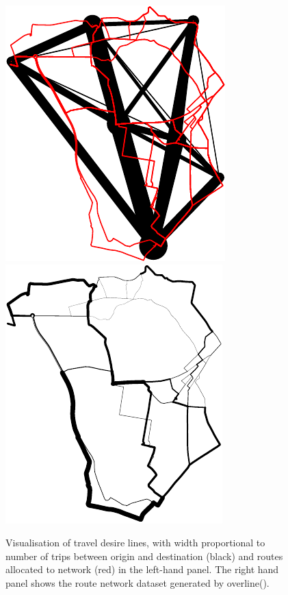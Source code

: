 \documentclass[11pt]{article}
\newenvironment{Shaded}{\begin{snugshade}}{\end{snugshade}}
\newcommand{\KeywordTok}[1]{\textcolor[rgb]{0.13,0.29,0.53}{\textbf{{#1}}}}
\newcommand{\DataTypeTok}[1]{\textcolor[rgb]{0.13,0.29,0.53}{{#1}}}
\newcommand{\DecValTok}[1]{\textcolor[rgb]{0.00,0.00,0.81}{{#1}}}
\newcommand{\StringTok}[1]{\textcolor[rgb]{0.31,0.60,0.02}{{#1}}}
\newcommand{\OtherTok}[1]{\textcolor[rgb]{0.56,0.35,0.01}{{#1}}}
\newcommand{\NormalTok}[1]{{#1}}
\begin{document}
\begin{Shaded}
\end{Shaded}

\begin{figure}
\includegraphics[width=0.5\linewidth]{stplanr-paper_files/figure-latex/lines_routes-1} \includegraphics[width=0.5\linewidth]{stplanr-paper_files/figure-latex/lines_routes-2} \caption{Visualisation of travel desire lines, with width proportional to number of trips between origin and destination (black) and routes allocated to network  (red) in the left-hand panel. The right hand panel shows the route network dataset generated by overline().}\label{fig:lines_routes}
\end{figure}
\end{document}

